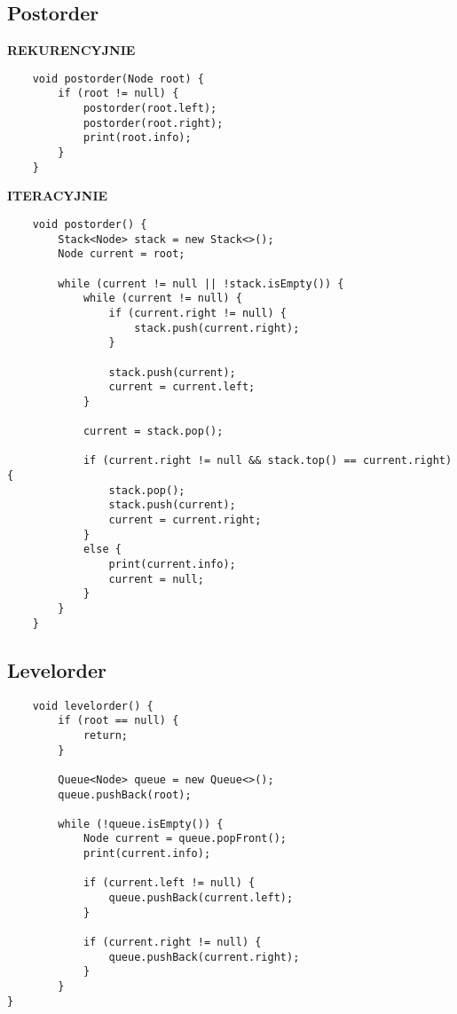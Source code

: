\documentclass[algorytmy.tex]{subfiles}
\begin{document}
\pagebreak

\subsection{Postorder}
        \textbf{REKURENCYJNIE}\\
\begin{verbatim}
    void postorder(Node root) {
        if (root != null) {
            postorder(root.left);
            postorder(root.right);
            print(root.info);
        }
    }
\end{verbatim}

        \textbf{ITERACYJNIE}\\
\begin{verbatim}
    void postorder() {
        Stack<Node> stack = new Stack<>();
        Node current = root;

        while (current != null || !stack.isEmpty()) {
            while (current != null) {
                if (current.right != null) {
                    stack.push(current.right);
                }

                stack.push(current);
                current = current.left;
            }

            current = stack.pop();

            if (current.right != null && stack.top() == current.right) {
                stack.pop();
                stack.push(current);
                current = current.right;
            }
            else {
                print(current.info);
                current = null;
            }
        }
    }
\end{verbatim}

\pagebreak

\subsection{Levelorder}

\begin{verbatim}
    void levelorder() {
        if (root == null) {
            return;
        }

        Queue<Node> queue = new Queue<>();
        queue.pushBack(root);

        while (!queue.isEmpty()) {
            Node current = queue.popFront();
            print(current.info);

            if (current.left != null) {
                queue.pushBack(current.left);
            }

            if (current.right != null) {
                queue.pushBack(current.right);
            }
        }
}
\end{verbatim}
\end{document}
